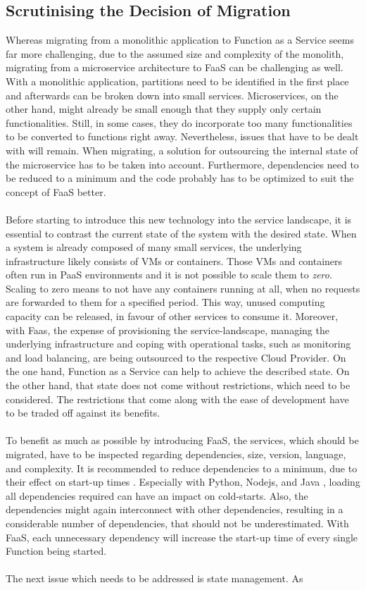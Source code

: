 \documentclass[a4paper,11pt, pagesize]{scrartcl}
\begin{document}
\begin{spacing}{1.2}
\subsection{Scrutinising the Decision of Migration}
Whereas migrating from a monolithic application to Function as a Service seems far more challenging, due to the assumed size and complexity of the monolith, migrating from a microservice architecture to FaaS can be challenging as well. With a monolithic application, partitions need to be identified in the first place and afterwards can be broken down into small services. Microservices, on the other hand, might already be small enough that they supply only certain functionalities. Still, in some cases, they do incorporate too many functionalities to be converted to functions right away. Nevertheless, issues that have to be dealt with will remain. When migrating, a solution for outsourcing the internal state of the microservice has to be taken into account. Furthermore, dependencies need to be reduced to a minimum and the code probably has to be optimized to suit the concept of FaaS better.\\\\ Before starting to introduce this new technology into the service landscape, it is essential to contrast the current state of the system with the desired state. When a system is already composed of many small services, the underlying infrastructure likely consists of VMs or containers. Those VMs and containers often run in PaaS environments and it is not possible to scale them to \textit{zero}. Scaling to zero means to not have any containers running at all, when no requests are forwarded to them for a specified period. This way, unused computing capacity can be released, in favour of other services to consume it. Moreover, with Faas, the expense of provisioning the service-landscape, managing the underlying infrastructure and coping with operational tasks, such as monitoring and load balancing, are being outsourced to the respective Cloud Provider. On the one hand, Function as a Service can help to achieve the described state. On the other hand, that state does not come without restrictions, which need to be considered. The restrictions that come along with the ease of development have to be traded off against its benefits.\\\\ To benefit as much as possible by introducing FaaS, the services, which should be migrated, have to be inspected regarding dependencies, size, version, language, and complexity. It is recommended to reduce dependencies to a minimum, due to their effect on start-up times \cite{manner2018cold}. Especially with Python, Nodejs, and Java \cite{puripunpinyo2017effect}, loading all dependencies required can have an impact on cold-starts. Also, the dependencies might again interconnect with other dependencies, resulting in a considerable number of dependencies, that should not be underestimated. With FaaS, each unnecessary dependency will increase the start-up time of every single Function being started.\\\\ The next issue which needs to be addressed is state management. As 
\end{spacing}
\end{document}
